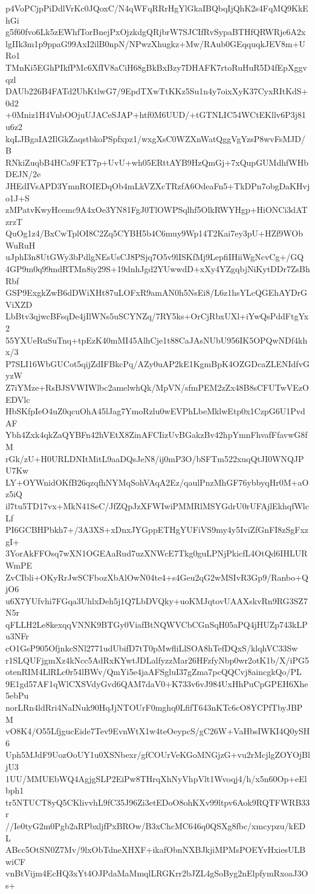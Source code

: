 p4VoPCjpPiDdlVrKc0JQoxC/N4qWFqRRrHgYlGkaIBQbqIjQhK2s4FqMQ9KkEhGi
g5f60fvo6Lk5zEWhfTorBnejPxOjzkdgQRjbrW7SJCIfRvSypaBTHfQRWRje6A2x
lgIIk3m1p9ppaG99AxI2ilB0npN/NPwzXhugkz+Mw/RAub0GEqquqkJEV8m+URo1
TMnKi5EGhPIkfPMc6XfIV8aCiH68gBkBxBzy7DHAFK7rtoRuHuR5D4fEpXggvqzl
DAUb226B4FATd2UbKtlwG7/9EpdTXwTtKKz5Su1n4y7oixXyK37CyxRItKdS+0d2
+0Mniz1H4VnbOOjuUJACeSJAP+htf0M6UUD/+tGTNLIC54WCtEKllv6P3j81u6z2
kqLJBgaIA2IlGkZaqstbkoPSpfxpz1/wxgXsC0WZXnWatQggVgYzsP8wvFsMJD/B
RNkiZuqbB4HCa9FET7p+UvU+wh05ERttAYB9HzQmGj+7xQupGUMdhfWHbDEJN/2e
JHEdIVsAPD3YmnROIEDqOb4mLkVZXcTRzfA6OdeaFn5+TkDPn7obgDaKHvjo1J+S
zMPatvKwyHcemc9A4xOe3YN81FgJ0TlOWPSqlhf5OlkRWYHgp+HiONCi3dATzrzT
QuOg1z4/BxCwTplOI8C2Zq5CYBH5b4C6muy9Wp14T2Kai7ey3pU+HZf9WObWuRuH
uJphI3n8UtGWy3bPdlgNEsUsCJ8PSjq7O5v9lISKfMj9LepfiIHiiWgNcvCg+/GQ
4GP9m0q99mdRTMn8iy29S+19dnhJgd2YUwwdD+xXy4YZgqbjNiKytDDr7ZsBhRbf
GSP9ExgkZwB6dDWiXHt87uLOFxR9amAN0h5NsEi8/L6z1hsYLcQGEhAYDrGViXZD
LbBtv3qjwcBFsqDe4jIlWNs5uSCYNZq/7RY5ks+OrCjRbxUXl+iYwQsPddFtgYx2
55YXUeRuSuTnq+tpEzK40mMI45AlhCje1t88CaJAsNUbU956IK5OPQwNDf4khx/3
P7SLI16WbGUCot5qijZdIFBkcPq/AZy0uAP2kE1KgmBpK4OZGDcaZLENIdfvGyzW
Z7iYMze+RsBJSVWIWlbc2amelwhQk/MpVN/sfmPEM2zZx48B8sCFUTwVEzOEDVlc
HbSKfpIeO4uZ0qcuOhA45lJag7YmoRzlu0wEVPhLbeMklwEtp0x1CzpG6U1PvdAF
Ybh4Zxk4qkZaQYBFn42hVEtX8ZinAFCIizUvBGakzBv42hpYmnFhvafFfavwG8fM
rGk/zU+H0URLDNItMitL9aaDQsJeN8/ij0mP3O/bSFTm522xuqQtJI0WNQJPU7Kw
LY+OYWnidOKfB26qzqfhNYMqSohVAqA2Ez/qaulPnzMhGF76ybbyqHr0M+aOz5iQ
il7tu5TD17vx+MkN41SeC/JfZQpJzXFWIwiPMMRlMSYGdrU0rUFAjlEkhqfWlcLf
PI6GCBHPbkh7+/3A3XS+xDnxJYGppETHgYUFiVS9my4y5IviZfGnFI8zSgFxzgI+
3YorAkFFOsq7wXN1OGEAaRud7uzXNWcE7Tkg0guLPNjPkicfL4OtQd6IHLURWmPE
ZvCIbli+OKyRrJwSCFbozXbAlOwN04te4+s4Geu2qG2wMSIvR3Gp9/Ranbo+QjO6
u6X7YUfvhi7FGqa3UhlxDeh5j1Q7LbDVQky+uoKMJqtovUAAXskvRn9RG3SZ7N5r
qFLLH2Le8kexqqVNNK9BTGy0ViafBtNQWVCbCGnSqH05aPQ4jHUZp743kLPu3NFr
cO1GsP905OfjnkcSNl2771udUbifD7tT0pMwfliLlSOA8hTefDQxS/klqhVC33Sw
r1SLQUFjgmXz4kNcc5AdRxKYwtJDLalfyzzMar26HFzfyNbp0wr2otK1b/X/iPG5
otenRIM4LlRLc0r54lBWv/QmYi5e4jaAFSgluI37gZma7pcQQCvj8aincgkQo/PL
9E1gd57AF1qWlCXSVdyGvd6QAM7daV0+K733v6vJ984UxHhPuCpGPEH6Xhe5ebPu
norLRn4ldRri4NaINuk90HqJjNTOUrF0mghq0LfifT643nKTc6cO8YCPfTbyJBPM
vO8K4/O55LfjgucEide7Tev9EvnWtX1w4teOeypcS/gC26W+VaHbsIWKI4Q0ySH6
Uph5MJdF9UozOoUY1u0XSNbexr/gfCOUrVeKGoMNGjzG+vu2rMcjlgZOYOjBljU3
1UU/MMUEbWQ4AgjgSLP2EiPw8THrqXhNyVhpVlt1Wvoqj4/h/x5n60Op+eElbph1
tr5NTUCT8yQ5CKlivvhL9fC35J96Zi3etEDoO8ohKXv99ltpv6Aok9RQTFWRB33r
//Ie0tyG2m0Pgb2aRPbxljfPxBROw/B3xChcMC646q0QSXg8fbc/xmcypzu/kEDL
ABcc5OtSN0Z7Mv/9lxObTdneXHXF+ikafObnNXBJkjiMPMsPOEYvHxiesULBwiCF
vnBtVijm4EcHQ3xYt4OJPdaMaMmqlLRGKrr2bJZL4gSoByg2nElpfymRxoaJ3Os+
